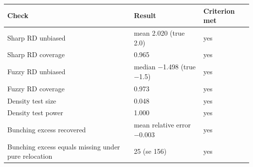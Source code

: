 \begin{tabular}{lll}
\toprule
Check & Result & Criterion met \\
\midrule
Sharp RD unbiased & mean 2.020 (true 2.0) & yes \\
Sharp RD coverage & 0.965 & yes \\
Fuzzy RD unbiased & median $-$1.498 (true $-$1.5) & yes \\
Fuzzy RD coverage & 0.973 & yes \\
Density test size & 0.048 & yes \\
Density test power & 1.000 & yes \\
Bunching excess recovered & mean relative error $-$0.003 & yes \\
Bunching excess equals missing under pure relocation & 25 (se 156) & yes \\
\bottomrule
\end{tabular}
